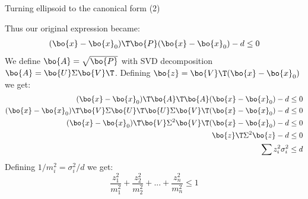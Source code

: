 \documentclass{beamer}
\begin{document}
\begin{frame}{Turning ellipsoid to the canonical form (2)}
	\begin{flushleft}
		
		Thus our original expression became:
		\begin{align}
			(\bo{x} - \bo{x}_0)\T \bo{P}(\bo{x} - \bo{x}_0) - d \leq 0
		\end{align}
		We define $\bo{A} = \sqrt{\bo{P}}$ with SVD decomposition $\bo{A} = \bo{U} \Sigma \bo{V}\T$. Defining $\bo{z} = \bo{V}\T (\bo{x} - \bo{x}_0)$ we get:
		\begin{align}
			(\bo{x} - \bo{x}_0)\T \bo{A}\T\bo{A}(\bo{x} - \bo{x}_0) - d \leq 0 
			\\
			(\bo{x} - \bo{x}_0)\T  \bo{V} \Sigma \bo{U}\T  \bo{U} \Sigma \bo{V}\T(\bo{x} - \bo{x}_0) - d \leq 0 
			\\
			(\bo{x} - \bo{x}_0)\T  \bo{V} \Sigma^2 \bo{V}\T(\bo{x} - \bo{x}_0) - d \leq 0
			\\
			\bo{z}\T   \Sigma^2 \bo{z} - d \leq 0
			\\
			\sum z_i^2 \sigma_i^2  \leq d
		\end{align}
		Defining $1/m_i^2 = \sigma_i^2 / d$ we get:
		\begin{equation}
			\frac{z_1^2}{m_1^2} + \frac{z_2^2}{m_2^2} + ... + 
			\frac{z_n^2}{m_n^2} \leq 1
		\end{equation}
		
		
	\end{flushleft}
\end{frame}
\end{document}
